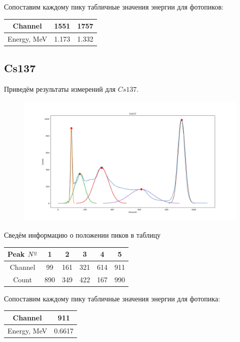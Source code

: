 \documentclass{article}
\begin{document}
Сопоставим каждому пику табличные значения энергии для фотопиков:

\begin{table}[H]
	\centering
	\begin{tabular}{|c|c|c|}
		\hline
		Channel       & 1551  & 1757 \\\hline
		Energy, MeV   & 1.173 & 1.332\\\hline
	\end{tabular}
\end{table}

\subsection{Cs137}
Приведём результаты измерений для \(Cs137\).

\begin{figure}[H]
	\includegraphics[width=\textwidth]{Cs137.png}
\end{figure}

Сведём информацию о положении пиков в таблицу

\begin{table}[H]
	\centering
	\begin{tabular}{|c|c|c|c|c|c|}
		\hline
		Peak \(N\textsuperscript{\underline{o}}\)& 1 & 2 & 3 & 4 & 5 \\\hline
		Channel & 99 & 161 & 321 & 614 & 911 \\\hline
		Count   & 890 & 349 & 422  & 167 & 990\\\hline
	\end{tabular}
\end{table}

Сопоставим каждому пику табличные значения энергии для фотопика:

\begin{table}[H]
	\centering
	\begin{tabular}{|c|c|}
		\hline
		Channel       & 911    \\\hline
		Energy, MeV   & 0.6617 \\\hline
	\end{tabular}
\end{table}
\end{document}
